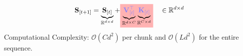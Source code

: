     



\begin{frame}{}
    
    \begin{align*}
        &\mathbf{S}_{[t+1]} = \underbrace{\mathbf{S}_{[t]}}_{\mathbb{R}^{d\times d}} + \colorbox{red!30}{$\underbrace{\color{blue!50}\mathbf{V}_{[t]}^\top}_{\mathbb{R}^{d\times C}} \underbrace{\color{blue!50}\mathbf{K}_{[t]}}_{\mathbb{R}^{C\times d}}$} &&\in \mathbb{R}^{d\times d}  \\
    \end{align*}
    Computational Complexity: $\mathcal{O}(Cd^2)$ per chunk and $\mathcal{O}(Ld^2)$ for the entire sequence.
\end{frame}

